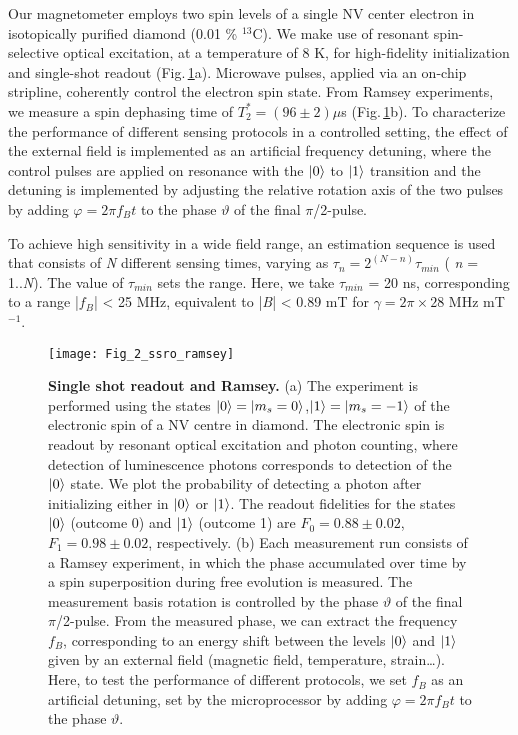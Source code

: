 Our magnetometer employs two spin levels of a single NV center electron in isotopically purified diamond (0.01 \% $^{13}$C). We make use of resonant spin-selective optical excitation, at a temperature of 8 K, for high-fidelity initialization and single-shot readout\cite{Robledo_Nature_2011} (Fig.\,\ref{fig:amm-fig2}a). Microwave pulses, applied via an on-chip stripline, coherently control the electron spin state. From Ramsey experiments, we measure a spin dephasing time of $T_2^* = (96 \pm 2) \mu$s (Fig.\,\ref{fig:amm-fig2}b). To characterize the performance of different sensing protocols in a controlled setting, the effect of the external field is implemented as an artificial frequency detuning, where the control pulses are applied on resonance with the $\left|0\right>$ to $\left|1\right>$ transition and the detuning is implemented by adjusting the relative rotation axis of the two pulses by adding $\varphi = 2 \pi f_B t$ to the phase $\vartheta$ of the final $\pi$/2-pulse. 

To achieve high sensitivity in a wide field range, an estimation sequence is used that consists of \textit{N} different sensing times\cite{Said_Phys.Rev.B_2011,Waldherr_NatNano_2012,Nusran_NatNano_2012,Cappellaro_Phys.Rev.A_2012}, varying as $\tau_n = 2^{(N-n)} \tau_{min}$ ( \textit{n} = 1..\textit{N}). The value of $\tau_{min}$ sets the range. Here, we take $\tau_{min}$ = 20 ns, corresponding to a range |$f_B$| < 25  MHz, equivalent to |\textit{B}| < 0.89 mT for $\gamma = 2 \pi \times 28$ MHz mT$^{-1}$.

\begin{figure*}
	\centering
	\texttt{[image: Fig\_2\_ssro\_ramsey]}
	\caption{\label{fig:amm-fig2} \textbf{Single shot readout and Ramsey.} (a) The experiment is performed using the states $\left|0\right> = \left|m_s = 0\right>$,$\left|1\right> = \left|m_s = -1\right>$ of the  electronic spin of a NV centre in diamond. The electronic spin is readout by resonant optical excitation and photon counting\cite{Robledo_Nature_2011}, where detection of luminescence photons corresponds to detection of the $\left|0\right>$ state. We plot the probability of detecting a photon after initializing either in $\left|0\right>$ or $\left|1\right>$. The readout fidelities for the states $\left|0\right>$ (outcome 0) and $\left|1\right>$  (outcome 1) are $F_0 = 0.88 \pm 0.02$, $F_1 = 0.98 \pm 0.02$, respectively. (b) Each measurement run consists of a Ramsey experiment, in which the phase accumulated over time by a spin superposition during free evolution is measured. The measurement basis rotation is controlled by the phase $\vartheta$ of the final $\pi$/2-pulse. From the measured phase, we can extract the frequency $f_B$, corresponding to an energy shift between the levels $\left|0\right>$ and $\left|1\right>$ given by an external field (magnetic field, temperature, strain…). Here, to test the performance of different protocols, we set $f_B$ as an artificial detuning, set by the microprocessor by adding $\varphi = 2 \pi f_B t$ to the phase $\vartheta$.}
\end{figure*}

